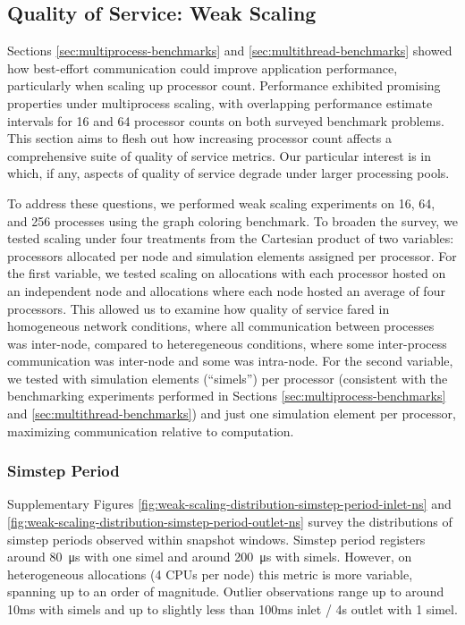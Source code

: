 \subsection{Quality of Service: Weak Scaling}
\label{sec:weak-scaling}

Sections \ref{sec:multiprocess-benchmarks} and \ref{sec:multithread-benchmarks} showed how best-effort communication could improve application performance, particularly when scaling up processor count.
Performance exhibited promising properties under multiprocess scaling, with overlapping performance estimate intervals for 16 and 64 processor counts on both surveyed benchmark problems.
This section aims to flesh out how increasing processor count affects a comprehensive suite of quality of service metrics.
Our particular interest is in which, if any, aspects of quality of service degrade under larger processing pools.

To address these questions, we performed weak scaling experiments on 16, 64, and 256 processes using the graph coloring benchmark.
To broaden the survey, we tested scaling under four treatments from the Cartesian product of two variables: processors allocated per node and simulation elements assigned per processor.
For the first variable, we tested scaling on allocations with each processor hosted on an independent node and allocations where each node hosted an average of four processors.
This allowed us to examine how quality of service fared in homogeneous network conditions, where all communication between processes was inter-node, compared to heteregeneous conditions, where some inter-process communication was inter-node and some was intra-node.
For the second variable, we tested with  simulation elements (``simels'') per processor (consistent with the benchmarking experiments performed in Sections \ref{sec:multiprocess-benchmarks} and \ref{sec:multithread-benchmarks}) and just one simulation element per processor, maximizing communication relative to computation.

\subsubsection{Simstep Period}

Supplementary Figures \ref{fig:weak-scaling-distribution-simstep-period-inlet-ns} and \ref{fig:weak-scaling-distribution-simstep-period-outlet-ns} survey the distributions of simstep periods observed within snapshot windows.
Simstep period registers around \SI{80}{\micro\second} with one simel and around \SI{200}{\micro\second} with  simels.
However, on heterogeneous allocations (4 CPUs per node) this metric is more variable, spanning up to an order of magnitude.
Outlier observations range up to around 10ms with  simels and up to slightly less than 100ms inlet / 4s outlet with 1 simel.

